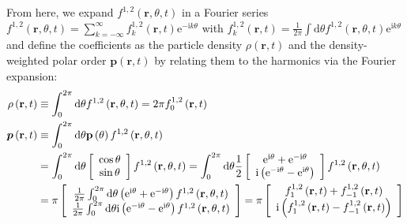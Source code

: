 \documentclass{article}
\begin{document}
From here, we expand $f^{1,2}\left( \mathbf{r},\theta ,t \right)$ in a Fourier series $f ^{1,2}\left( \mathbf{r},\theta ,t \right) =\sum_{k=-\infty}^{\infty}{f _{k}^{1,2}\left( \mathbf{r},t \right) \mathrm{e}^{-\mathrm{i}k\theta}}$ with $f _{k}^{1,2}\left( \mathbf{r},t \right) =\frac{1}{2\pi}\int{\mathrm{d}\theta f ^{1,2}\left( \mathbf{r},\theta ,t \right) \mathrm{e}^{\mathrm{i}k\theta}}$ and define the coefficients  as the particle density $ \rho\left(\mathbf{r}, t\right)$ and the density-weighted polar order $\boldsymbol{p}\left(\mathbf{r}, t\right)$ by relating them to the harmonics via the Fourier expansion:
\begin{subequations}
    \begin{align}
        \rho \left( \mathbf{r},t \right) &\equiv \int_0^{2\pi}{\mathrm{d}\theta f^{1,2}\left( \mathbf{r},\theta ,t \right)}=2\pi f_{0}^{1,2}\left( \mathbf{r},t \right)\\
        \boldsymbol{p}\left( \mathbf{r},t \right) &\equiv \int_0^{2\pi}{\mathrm{d}\theta \mathbf{p}\left( \theta \right) f^{1,2}\left( \mathbf{r},\theta ,t \right)}\notag\\
        &=\int_0^{2\pi}{\mathrm{d}\theta \left[ \begin{array}{c}
        \cos \theta\\
        \sin \theta\\
    \end{array} \right] f^{1,2}\left( \mathbf{r},\theta ,t \right)}=\int_0^{2\pi}{\mathrm{d}\theta \frac{1}{2}\left[ \begin{array}{c}
        \mathrm{e}^{\mathrm{i}\theta}+\mathrm{e}^{-\mathrm{i}\theta}\\
        \mathrm{i}\left( \mathrm{e}^{-\mathrm{i}\theta}-\mathrm{e}^{\mathrm{i}\theta} \right)\\
    \end{array} \right] f^{1,2}\left( \mathbf{r},\theta ,t \right)}\notag\\
        &=\pi \left[ \begin{array}{c}
        \frac{1}{2\pi}\int_0^{2\pi}{\mathrm{d}\theta \left( \mathrm{e}^{\mathrm{i}\theta}+\mathrm{e}^{-\mathrm{i}\theta} \right) f^{1,2}\left( \mathbf{r},\theta ,t \right)}\\
        \frac{1}{2\pi}\int_0^{2\pi}{\mathrm{d}\theta \mathrm{i}\left( \mathrm{e}^{-\mathrm{i}\theta}-\mathrm{e}^{\mathrm{i}\theta} \right) f^{1,2}\left( \mathbf{r},\theta ,t \right)}\\
    \end{array} \right] =\pi \left[ \begin{array}{c}
        f_{1}^{1,2}\left( \mathbf{r},t \right) +f_{-1}^{1,2}\left( \mathbf{r},t \right)\\
        \mathrm{i}\left( f_{1}^{1,2}\left( \mathbf{r},t \right) -f_{-1}^{1,2}\left( \mathbf{r},t \right) \right)\\
    \end{array} \right]
    \end{align}
\end{subequations}
\end{document}
